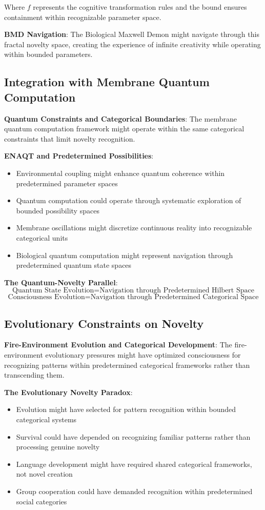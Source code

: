\documentclass[12pt]{article}
\begin{document}
Where $f$ represents the cognitive transformation rules and the bound ensures containment within recognizable parameter space.

\textbf{BMD Navigation}: The Biological Maxwell Demon might navigate through this fractal novelty space, creating the experience of infinite creativity while operating within bounded parameters.

\subsection{Integration with Membrane Quantum Computation}

\textbf{Quantum Constraints and Categorical Boundaries}: The membrane quantum computation framework might operate within the same categorical constraints that limit novelty recognition.

\textbf{ENAQT and Predetermined Possibilities}:
\begin{itemize}
\item Environmental coupling might enhance quantum coherence within predetermined parameter spaces
\item Quantum computation could operate through systematic exploration of bounded possibility spaces
\item Membrane oscillations might discretize continuous reality into recognizable categorical units
\item Biological quantum computation might represent navigation through predetermined quantum state spaces
\end{itemize}

\textbf{The Quantum-Novelty Parallel}:
$$\text{Quantum State Evolution} = \text{Navigation through Predetermined Hilbert Space}$$
$$\text{Consciousness Evolution} = \text{Navigation through Predetermined Categorical Space}$$

\subsection{Evolutionary Constraints on Novelty}

\textbf{Fire-Environment Evolution and Categorical Development}: The fire-environment evolutionary pressures might have optimized consciousness for recognizing patterns within predetermined categorical frameworks rather than transcending them.

\textbf{The Evolutionary Novelty Paradox}:
\begin{itemize}
\item Evolution might have selected for pattern recognition within bounded categorical systems
\item Survival could have depended on recognizing familiar patterns rather than processing genuine novelty
\item Language development might have required shared categorical frameworks, not novel creation
\item Group cooperation could have demanded recognition within predetermined social categories
\end{itemize}
\end{document}
